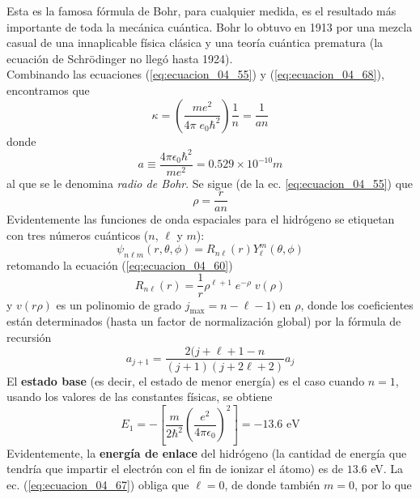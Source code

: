 Esta es la famosa fórmula de Bohr, para cualquier medida, es el resultado más importante de toda la mecánica cuántica. Bohr lo obtuvo en 1913 por una mezcla casual de una innaplicable física clásica y una teoría cuántica prematura (la ecuación de Schrödinger no llegó hasta 1924).
\\
Combinando las ecuaciones (\ref{eq:ecuacion_04_55}) y (\ref{eq:ecuacion_04_68}), encontramos que
\begin{equation}
\kappa = \left( \dfrac{m e^{2}}{4 \pi \; e_{0} \hbar^{2}} \right) \dfrac{1}{n} = \dfrac{1}{a n}
\label{eq:ecuacion_04_71}
\end{equation}
donde
\begin{equation}
\boxed{a \equiv \dfrac{4 \pi \epsilon_{0} \hbar^{2}}{m e^{2}} = 0.529 \times 10^{-10}  m}
\label{eq:ecuacion_04_72}
\end{equation}
al que se le denomina \emph{radio de Bohr}. Se sigue (de la ec. \ref{eq:ecuacion_04_55}) que
\begin{equation}
\rho = \dfrac{r}{a n}
\label{eq:ecuacion_04_73}
\end{equation}
Evidentemente las funciones de onda espaciales para el hidrógeno se etiquetan con tres números cuánticos ($n$, $\ell$ y $m$):
\begin{equation}
\psi_{n \ell m} (r, \theta, \phi) =  R_{n \ell} (r) Y_{\ell}^{m} (\theta, \phi)
\label{eq:ecuacion_04_74}
\end{equation}
retomando la ecuación (\ref{eq:ecuacion_04_60})
\begin{equation}
R_{n \ell}(r) = \dfrac{1}{r} \rho^{\ell + 1} \; e^{-\rho} \; v(\rho)
\label{eq:ecuacion_04_75}
\end{equation}
y $v(r\rho)$ es un polinomio de grado $j_{\text{max}} = n - \ell - 1)$ en $\rho$, donde los coeficientes están determinados (hasta un factor de normalización global) por la fórmula de recursión
\begin{equation}
a_{j+1} = \dfrac{2 (j + \ell + 1 - n}{(j + 1)(j + 2 \ell + 2)} a_{j}
\label{eq:ecuacion_04_76}
\end{equation}
El \textbf{estado base} (es decir, el estado de menor energía) es el caso cuando $n = 1$, usando los valores de las constantes físicas, se obtiene
\begin{equation}
E_{1} = - \left[ \dfrac{m}{2 \hbar^{2}} \left( \dfrac{e^{2}}{4 \pi \epsilon_{0}} \right)^{2} \right] =  -13.6 \text{ eV}
\label{eq:ecuacion_04_77}
\end{equation}
Evidentemente, la \textbf{energía de enlace} del hidrógeno (la cantidad de energía que tendría que impartir el electrón con el fin de ionizar el átomo) es de $13.6$ eV. La ec. (\ref{eq:ecuacion_04_67}) obliga que $\ell = 0$, de donde también $m = 0$, por lo que
